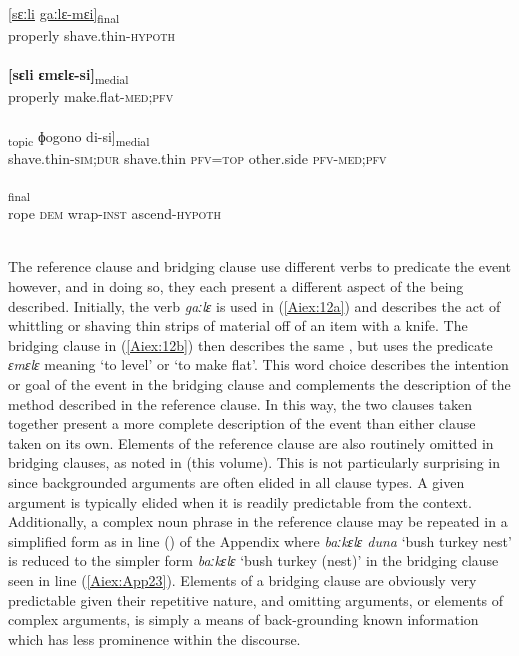 \documentclass[output=paper]{LSP/langsci}
\begin{document}
\begin{exe}
\ex \label{Aiex:12ad}
\begin{xlist}
\ex \label{Aiex:12a}
\gll \underline{[sɛːli}	\underline{gaːlɛ-mɛi]}\textsubscript{final}\\
properly	shave.thin-\textsc{hypoth}\\
\glt {}\\
\ex \label{Aiex:12b}
\gll \textbf{[sɛli}	\textbf{ɛmɛlɛ-si]}\textsubscript{medial}\\
properly	make.flat-\textsc{med};\textsc{pfv}\\
\glt {}\\
\ex \label{Aiex:12c}
\gll [[gaːjɛ-liːː	gaːlɛ	di=jaː]\textsubscript{topic}	ɸogono	di-si]\textsubscript{medial}\\
shave.thin-\textsc{sim};\textsc{dur}	shave.thin	\textsc{pfv}=\textsc{top}	other.side	\textsc{pfv}-\textsc{med};\textsc{pfv}\\
\glt {}\\
\ex \label{Aiex:12d}
\textsubscript{final}\\
rope	\textsc{dem}	wrap-\textsc{inst}	ascend-\textsc{hypoth}\\
\glt	{}\\
\end{xlist}
\end{exe}

The reference clause and bridging clause use different verbs to predicate the event however, and in doing so, they each present a different aspect of the  being described. Initially, the verb  \textit{gaːlɛ} is used in (\ref{Aiex:12a}) and describes the act of whittling or shaving thin strips of material off of an item with a knife. The bridging clause in (\ref{Aiex:12b}) then describes the same , but uses the predicate \textit{ɛmɛlɛ} meaning `to level' or `to make flat'. This word choice describes the intention or goal of the event in the bridging clause and complements the description of the method described in the reference clause. In this way, the two clauses taken together present a more complete description of the event than either clause taken on its own. Elements of the reference clause are also routinely omitted in bridging clauses, as noted in \citeauthor{guerin18} (this volume). This is not particularly surprising in  since backgrounded arguments are often elided in all  clause types. A given argument is typically elided when it is readily predictable from the context. Additionally, a complex noun phrase in the reference clause may be repeated in a simplified form as in line () of the Appendix where \textit{baːkɛlɛ duna} `bush turkey nest' is reduced to the simpler form \textit{baːkɛlɛ} `bush turkey (nest)' in the bridging clause seen in line (\ref{Aiex:App23}). Elements of a bridging clause are obviously very predictable given their repetitive nature, and omitting arguments, or elements of complex arguments, is simply a means of back-grounding known information which has less prominence within the discourse.
\end{document}

